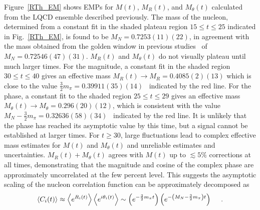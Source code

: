 Figure~\ref{RTh_EM} shows EMPs for $M(t)$, $M_R(t)$, and $M_\theta(t)$ calculated from the LQCD ensemble described previously. 
The mass of the nucleon, 
determined from a constant fit in the shaded plateau region $15 \leq t \leq 25$ indicated in Fig.~\ref{RTh_EM},
is found  to be 
$M_N = 0.7253(11)(22)$,
 in agreement with the mass obtained from the golden window in previous studies~\cite{Orginos:2015aya} of 
 $M_N = 0.72546(47)(31)$.
$M_R(t)$ and $M_\theta(t)$ do not visually plateau until much larger times. 
For the magnitude, a constant fit in the shaded region $30 \leq t \leq 40$ gives an effective mass 
$M_R(t) \rightarrow M_R = 0.4085(2)(13)$ which is  close to the value 
$\frac{3}{2}m_\pi = 0.39911(35)(14)$~\cite{Orginos:2015aya} 
indicated by the red line. 
For the  phase, a constant fit to the shaded region $25\leq t \leq 29$ gives an effective mass 
$M_\theta(t) \rightarrow M_\theta = 0.296(20)(12)$, which is  consistent with the value 
$M_N - \frac{3}{2} m_\pi = 0.32636(58)(34)$~\cite{Orginos:2015aya} 
indicated by the red line. 
It is unlikely that the  phase has reached its asymptotic value by this time, but a signal cannot be established at larger times. 
For $t\geq 30$, 
large fluctuations lead to complex effective mass estimates for $M(t)$ and $M_\theta(t)$ and unreliable estimates and uncertainties.  
$M_R(t) + M_\theta(t)$ agrees with $M(t)$ up to $\lesssim 5\%$ corrections at all times, demonstrating that the magnitude and 
cosine of the complex phase are approximately uncorrelated at the few percent level. 
This suggests the asymptotic scaling of the nucleon correlation function can be approximately decomposed as
%
\begin{equation}
  \begin{split}
    \left< C_i(t) \right> \approx \left< e^{R_i(t)} \right>\left< e^{i\theta_i(t)} \right> \sim \left(  e^{-\frac{3}{2}m_\pi t}\right)\left(  e^{-\left( M_N - \frac{3}{2}m_\pi \right)t}\right)
    \ \ \ \ .
  \end{split}\label{RThScaling}
\end{equation}
%




